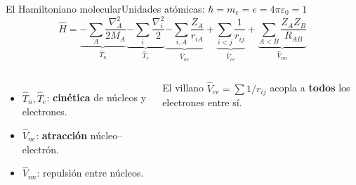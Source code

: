 \documentclass[aspectratio=169]{beamer}
\begin{document}
\begin{frame}{El Hamiltoniano molecular}{Unidades atómicas: $\hbar=m_e=e=4\pi\varepsilon_0=1$}
  \[
  \hat H=\underbrace{-\sum_A\frac{\nabla_A^2}{2M_A}}_{\hat T_n}
        \underbrace{-\sum_i\frac{\nabla_i^2}{2}}_{\hat T_e}
        \underbrace{-\sum_{i,A}\frac{Z_A}{r_{iA}}}_{\hat V_{ne}}
        +\underbrace{\sum_{i<j}\frac{1}{r_{ij}}}_{\hat V_{ee}}
        +\underbrace{\sum_{A<B}\frac{Z_AZ_B}{R_{AB}}}_{\hat V_{nn}}
  \]
  \vspace{.2em}
  \begin{columns}[T,onlytextwidth]
      \begin{itemize}\setlength\itemsep{3pt}
        \item $\hat T_n,\hat T_e$: \textbf{cinética} de núcleos y electrones.
        \item $\hat V_{ne}$: \textbf{atracción} núcleo--electrón.
        \item $\hat V_{nn}$: repulsión entre núcleos.
      \end{itemize}
      \begin{alertblock}{El villano}
        $\hat V_{ee}=\sum 1/r_{ij}$ acopla a \textbf{todos} los electrones entre sí.
      \end{alertblock}
  \end{columns}
\end{frame}
\end{document}
